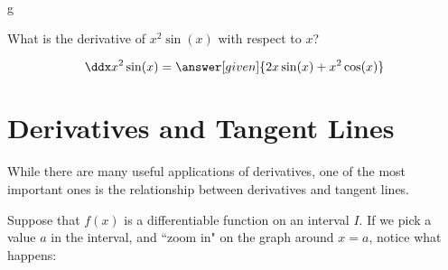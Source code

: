 g\documentclass[nooutcomes]{ximera}
\begin{document}
 
\begin{question} 
  What is the derivative of $x^2 \sin(x) $ with respect to $x$?
  \begin{prompt} 
    \[
    \ddx x^2 \sin(x) = \answer[given]{2x \sin(x) +x^2 \cos(x)}
    \]
  \end{prompt}
\end{question}


\section{Derivatives and Tangent Lines}

While there are many useful applications of derivatives, one of the most important ones is the relationship between derivatives and tangent lines.

Suppose that $f(x)$ is a differentiable function on an interval $I$.  If we pick a value $a$ in the interval, and ``zoom in" on the graph around $x=a$, notice what happens:
\end{document}
